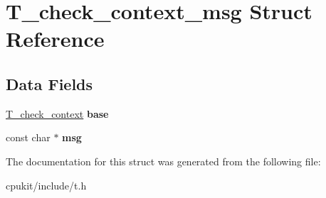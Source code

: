 \hypertarget{structT__check__context__msg}{}\section{T\+\_\+check\+\_\+context\+\_\+msg Struct Reference}
\label{structT__check__context__msg}
\subsection*{Data Fields}
\begin{DoxyCompactItemize}
\item 
\mbox{\label{structT__check__context__msg_a747fb6150d8ee51d66e05b67f7211d41}} 
\mbox{\hyperlink{structT__check__context}{T\+\_\+check\+\_\+context}} {\bfseries base}
\item 
\mbox{\label{structT__check__context__msg_a0a661a0aff118b721b6e0c7d2270c729}} 
const char $\ast$ {\bfseries msg}
\end{DoxyCompactItemize}


The documentation for this struct was generated from the following file\+:\begin{DoxyCompactItemize}
\item 
cpukit/include/t.\+h\end{DoxyCompactItemize}
